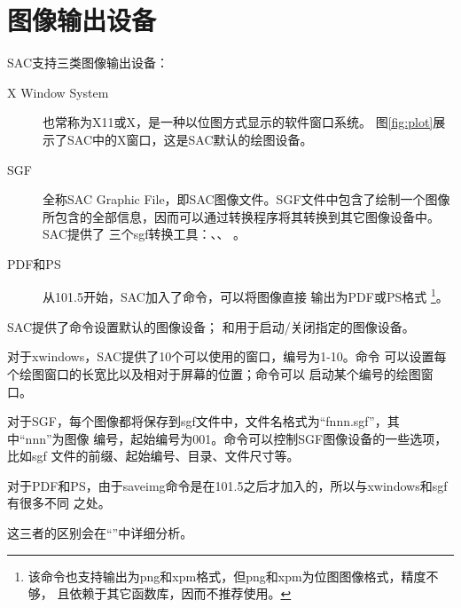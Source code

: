 \section{图像输出设备}
SAC支持三类图像输出设备：
\begin{description}
\item [X Window System] 也常称为X11或X，是一种以位图方式显示的软件窗口系统。
    图\ref{fig:plot}展示了SAC中的X窗口，这是SAC默认的绘图设备。
\item [SGF] 全称SAC Graphic File，即SAC图像文件。SGF文件中包含了绘制一个图像
    所包含的全部信息，因而可以通过转换程序将其转换到其它图像设备中。SAC提供了
    三个sgf转换工具：、、
    。
\item [PDF和PS] 从101.5开始，SAC加入了命令，可以将图像直接
    输出为PDF或PS格式
    \footnote{该命令也支持输出为png和xpm格式，但png和xpm为位图图像格式，精度不够，
    且依赖于其它函数库，因而不推荐使用。}。
\end{description}

SAC提供了命令设置默认的图像设备；
和用于启动/关闭指定的图像设备。

对于xwindows，SAC提供了10个可以使用的窗口，编号为1-10。命令
可以设置每个绘图窗口的长宽比以及相对于屏幕的位置；命令可以
启动某个编号的绘图窗口。

对于SGF，每个图像都将保存到sgf文件中，文件名格式为``fnnn.sgf''，其中``nnn''为图像
编号，起始编号为001。命令可以控制SGF图像设备的一些选项，比如sgf
文件的前缀、起始编号、目录、文件尺寸等。

对于PDF和PS，由于saveimg命令是在101.5之后才加入的，所以与xwindows和sgf有很多不同
之处。

这三者的区别会在``''中详细分析。
